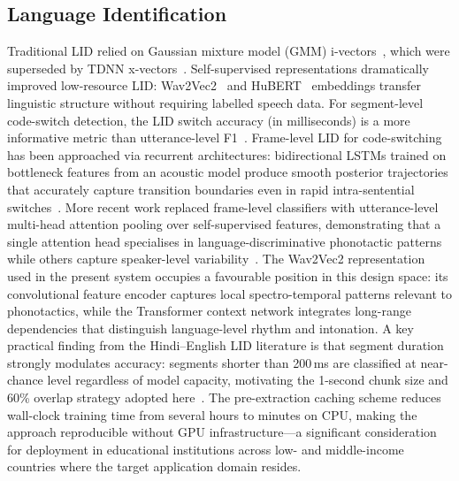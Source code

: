 \documentclass[10pt,twocolumn]{article}
\begin{document}
\subsection{Language Identification}
Traditional LID relied on Gaussian mixture model (GMM) i-vectors~\cite{dehak2011front}, which were superseded by TDNN x-vectors~\cite{snyder2018spoken}. Self-supervised representations dramatically improved low-resource LID: Wav2Vec2~\cite{baevski2020wav2vec} and HuBERT~\cite{hsu2021hubert} embeddings transfer linguistic structure without requiring labelled speech data. For segment-level code-switch detection, the LID switch accuracy (in milliseconds) is a more informative metric than utterance-level F1~\cite{lyu2015mandarin}. Frame-level LID for code-switching has been approached via
recurrent architectures: bidirectional LSTMs trained on bottleneck
features from an acoustic model produce smooth posterior
trajectories that accurately capture transition boundaries even in
rapid intra-sentential switches~\cite{toshniwal2018multilingual}.
More recent work replaced frame-level classifiers with
utterance-level multi-head attention pooling over
self-supervised features, demonstrating that a single attention
head specialises in language-discriminative phonotactic patterns
while others capture speaker-level variability~\cite{fan2020exploring}.
The Wav2Vec2 representation used in the present system occupies
a favourable position in this design space: its convolutional
feature encoder captures local spectro-temporal patterns
relevant to phonotactics, while the Transformer context network
integrates long-range dependencies that distinguish language-level
rhythm and intonation. A key practical finding from the
Hindi--English LID literature is that segment duration strongly
modulates accuracy: segments shorter than 200\,ms are
classified at near-chance level regardless of model capacity,
motivating the 1-second chunk size and 60\% overlap strategy
adopted here~\cite{bhuvanagiri2010approach}. The pre-extraction
caching scheme reduces wall-clock training time from several hours
to minutes on CPU, making the approach reproducible without GPU
infrastructure---a significant consideration for deployment in
educational institutions across low- and middle-income countries
where the target application domain resides.
\end{document}

